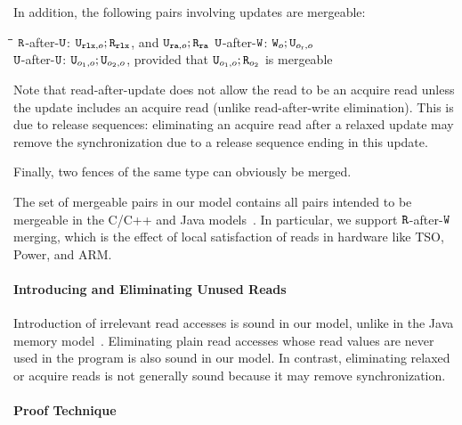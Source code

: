 In addition, the following pairs involving updates are mergeable:
\begin{tabbing}
\hspace{1.5cm}\=\hspace{4.4cm}\=\hspace{1.5cm}\=\hspace{1.5cm}\kill
 $\texttt{R}$-after-$\texttt{U}$: \> $\texttt{U}_{\texttt{rlx}, o}; \texttt{R}_{\texttt{rlx}}$, and $\texttt{U}_{\texttt{ra}, o}; \texttt{R}_{\texttt{ra}}$ \> %
  $\texttt{U}$-after-$\texttt{W}$: \>   $\texttt{W}_o; \texttt{U}_{o_{\text{r}}, o}$ \\[1mm] %
 $\texttt{U}$-after-$\texttt{U}$: \>   $\texttt{U}_{o_1, o}; \texttt{U}_{o_2, o}$, provided that $\texttt{U}_{o_1, o}; \texttt{R}_{o_2}$ is mergeable 
\end{tabbing} 
Note that read-after-update does not allow the read to be an acquire read unless the update includes an acquire read
(unlike read-after-write elimination). This is due to release sequences:
 eliminating an acquire read after a relaxed update may remove the synchronization 
due to a release sequence ending in this update.
 
Finally, two fences of the same type can obviously be merged.

The set of mergeable pairs in our model contains all pairs intended to be mergeable in the C/C++ and Java models~\cite{c11comp,sevcik:jmm}.
In particular, we support $\texttt{R}$-after-$\texttt{W}$ merging, which is the effect of local satisfaction of reads
in hardware like TSO, Power, and ARM.

\paragraph{Introducing and Eliminating Unused Reads}
Introduction of irrelevant read accesses is sound in our model, unlike in the Java memory model~\cite{sevcik:jmm}.
Eliminating plain read accesses whose read values are never used in the program is also sound in our model.
In contrast, eliminating relaxed or acquire reads is not generally sound because it may remove synchronization.


\paragraph{Proof Technique}

